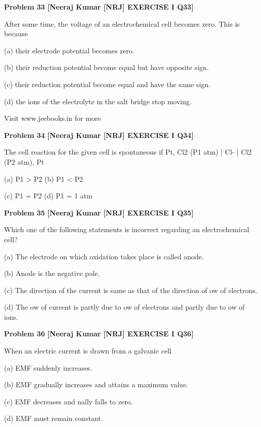 \begin{problembox}
\textbf{Problem 33} \hfill \textbf{[Neeraj Kumar [NRJ] EXERCISE I Q33]}
\label{q:ext-nrj_all_questions-33}

After some time, the voltage of an electrochemical 
cell becomes zero. This is because
 
 (a)  their electrode potential becomes zero.
 
 (b)  their reduction potential become equal but 
have opposite sign.
 
 (c)  their reduction potential become equal and 
have the same sign.
 
 (d)  the ions of the electrolyte in the salt bridge 
stop moving.
 
 
Visit www.jeebooks.in for more
\end{problembox}

\begin{problembox}
\textbf{Problem 34} \hfill \textbf{[Neeraj Kumar [NRJ] EXERCISE I Q34]}
\label{q:ext-nrj_all_questions-34}

The cell reaction for the given cell is spontaneous 
if Pt, Cl2 (P1 atm) | Cl- | Cl2 (P2 atm), Pt
 
 (a) P1 > P2 
(b) P1 < P2
 
 (c) P1 = P2 
(d) P1 = 1 atm
\end{problembox}

\begin{problembox}
\textbf{Problem 35} \hfill \textbf{[Neeraj Kumar [NRJ] EXERCISE I Q35]}
\label{q:ext-nrj_all_questions-35}

Which one of the following statements is incorrect 
regarding an electrochemical cell?
 
 (a)  The electrode on which oxidation takes place 
is called anode.
 
 (b) Anode is the negative pole.
 
 (c)  The direction of the current is same as that of 
the direction of   ow of electrons.
 
 (d)  The   ow of current is partly due to   ow of 
electrons and partly due to   ow of ions.
\end{problembox}

\begin{problembox}
\textbf{Problem 36} \hfill \textbf{[Neeraj Kumar [NRJ] EXERCISE I Q36]}
\label{q:ext-nrj_all_questions-36}

When an electric current is drawn from a galvanic 
cell
 
 (a) EMF suddenly increases.
 
 (b)  EMF gradually increases and attains a 
maximum value.
 
 (c)  EMF decreases and   nally falls to zero.
 
 (d) EMF must remain constant.
\end{problembox}


